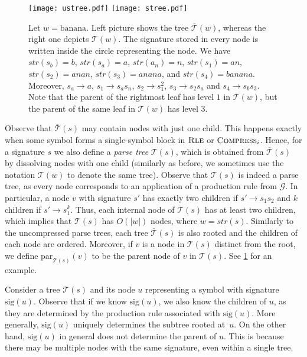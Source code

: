 \documentclass[a4paper]{article}
\theoremstyle{remark}
\newcommand{\compress}{\textsc{Compress}}
\newcommand{\rle}{\textsc{Rle}}
\newcommand{\str}{w}
\newcommand{\grammar}{\mathcal{G}}
\newcommand{\spair}[3]{\ensuremath{#1 \rightarrow #2#3}}
\newcommand{\spower}[3]{\ensuremath{#1 \rightarrow #2^{#3}}}
\newcommand{\stree}{\mathcal{T}}
\newcommand{\sstr}{\textit{str}}
\newcommand{\ustree}{\mathcal{\overline{T}}}
\newcommand{\spar}[1]{\mathrm{par}_{\stree(#1)}}
\newcommand{\ussig}{\mathrm{sig}}
\begin{document}
\begin{figure}[ht]
\hspace{20pt}
\texttt{[image: ustree.pdf]}
\hfill
\texttt{[image: stree.pdf]}
\hspace{20pt}
\caption{Let $\str = \textrm{banana}$. Left picture shows the tree $\ustree(\str)$, whereas the right one depicts $\stree(\str)$.
The signature stored in every node is written inside the circle representing the node.
We have $\sstr(s_b) = b$, $\sstr(s_a) = a$, $\sstr(a_n) = n$, $\sstr(s_1) = an$, $\sstr(s_2) = anan$, $\sstr(s_3) = anana$, and $\sstr(s_4) = banana$.
Moreover, $s_a \rightarrow a$, $\spair{s_1}{s_a}{s_n}$, $\spower{s_2}{s_1}{2}$, $\spair{s_3}{s_2}{s_a}$ and $\spair{s_4}{s_b}{s_3}$.
Note that the parent of the rightmost leaf has level $1$ in $\ustree(\str)$, but the parent of the same leaf in $\stree(\str)$ has level $3$.
}
\label{fig:trees}
\end{figure}
 
Observe that $\ustree(s)$ may contain nodes with just one child.
This happens exactly when some symbol forms a single-symbol block in $\rle$ or $\compress_i$.
Hence, for a signature $s$ we also define a \emph{parse tree} $\stree(s)$, which is obtained from $\ustree(s)$ by dissolving nodes with one child (similarly as before, we sometimes use the notation $\stree(\str)$ to denote the same tree).
Observe that $\stree(s)$ is indeed a parse tree, as every node corresponds to an application of a production rule from $\grammar$.
In particular, a node $v$ with signature $s'$ has exactly two children if $\spair{s'}{s_1}{s_2}$ and $k$ children if $\spower{s'}{s_1}{k}$.
Thus, each internal node of $\stree(s)$ has at least two children, which implies that $\stree(s)$ has $O(|\str|)$ nodes, where $\str=\sstr(s)$.
Similarly to the uncompressed parse trees, each tree $\ustree(s)$ is also rooted and the children of each node are ordered.
Moreover, if $v$ is a node in $\stree(s)$ distinct from the root, we define $\spar{s}(v)$ to be the parent node of $v$ in $\stree(s)$.
See \cref{fig:trees} for an example.

Consider a tree $\stree(s)$ and its node $u$ representing a symbol with signature $\ussig(u)$.
Observe that if we know $\ussig(u)$, we also know the children of $u$, as they are determined by the production rule associated with $\ussig(u)$.
More generally, $\ussig(u)$ uniquely determines the subtree rooted at~$u$.
On the other hand, $\ussig(u)$ in general does not determine the parent of $u$.
This is because there may be multiple nodes with the same signature, even within a single tree.
\end{document}
